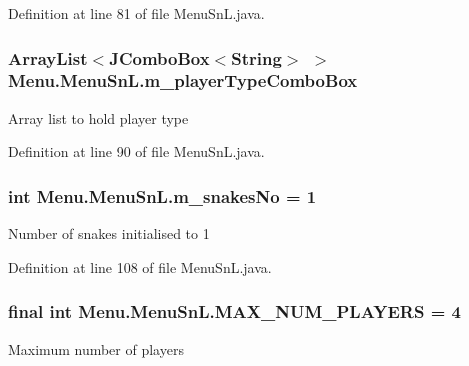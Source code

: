 Definition at line 81 of file Menu\+Sn\+L.\+java.

\hypertarget{class_menu_1_1_menu_sn_l_a70c6fa4562124ab11bab5d572daf82b3}{}
\subsubsection[{m\+\_\+player\+Type\+Combo\+Box}]{\setlength{\rightskip}{0pt plus 5cm}Array\+List$<$J\+Combo\+Box$<$String$>$ $>$ Menu.\+Menu\+Sn\+L.\+m\+\_\+player\+Type\+Combo\+Box\hspace{0.3cm}{\ttfamily [private]}}\label{class_menu_1_1_menu_sn_l_a70c6fa4562124ab11bab5d572daf82b3}
Array list to hold player type 

Definition at line 90 of file Menu\+Sn\+L.\+java.

\hypertarget{class_menu_1_1_menu_sn_l_a5787c03e612eb9adb0f0ee976810be88}{}
\subsubsection[{m\+\_\+snakes\+No}]{\setlength{\rightskip}{0pt plus 5cm}int Menu.\+Menu\+Sn\+L.\+m\+\_\+snakes\+No = 1\hspace{0.3cm}{\ttfamily [private]}}\label{class_menu_1_1_menu_sn_l_a5787c03e612eb9adb0f0ee976810be88}
Number of snakes initialised to 1 

Definition at line 108 of file Menu\+Sn\+L.\+java.

\hypertarget{class_menu_1_1_menu_sn_l_afc7fd19db34602b6b5a85df60c736103}{}
\subsubsection[{M\+A\+X\+\_\+\+N\+U\+M\+\_\+\+P\+L\+A\+Y\+E\+R\+S}]{\setlength{\rightskip}{0pt plus 5cm}final int Menu.\+Menu\+Sn\+L.\+M\+A\+X\+\_\+\+N\+U\+M\+\_\+\+P\+L\+A\+Y\+E\+R\+S = 4\hspace{0.3cm}{\ttfamily [private]}}\label{class_menu_1_1_menu_sn_l_afc7fd19db34602b6b5a85df60c736103}
Maximum number of players 

